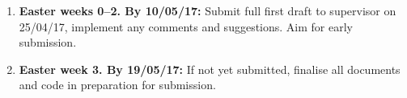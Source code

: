 \begin{enumerate}
\item \textbf{Easter weeks 0--2. By 10/05/17:} Submit full first draft to supervisor on 25/04/17, implement any comments and suggestions. Aim for early submission.

\item \textbf{Easter week 3. By 19/05/17:} If not yet submitted, finalise all documents and code in preparation for submission.

\end{enumerate}
